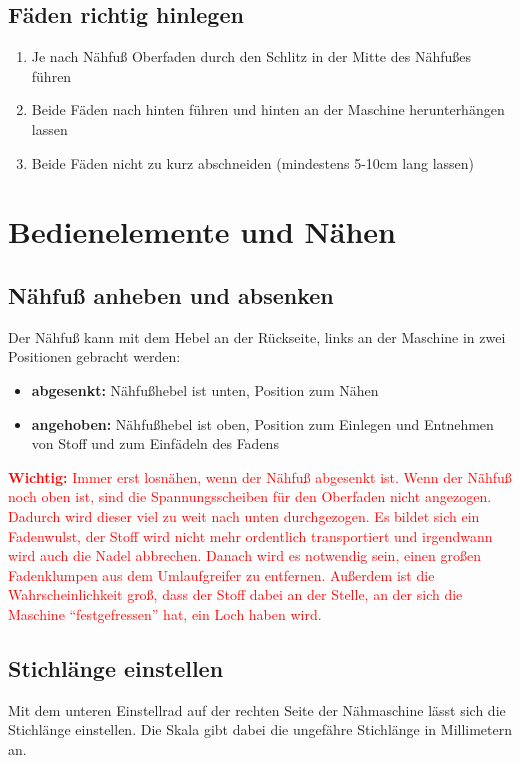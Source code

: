 \documentclass{\basedir/fablab-document}
\begin{document}
\subsection{Fäden richtig hinlegen}
\begin{enumerate}
	\item Je nach Nähfuß Oberfaden durch den Schlitz in der Mitte des Nähfußes führen
	\item Beide Fäden nach hinten führen und hinten an der Maschine herunterhängen lassen
	\item Beide Fäden nicht zu kurz abschneiden (mindestens 5-10cm lang lassen)
\end{enumerate}


\clearpage
\section{Bedienelemente und Nähen}
\subsection{Nähfuß anheben und absenken}
Der Nähfuß kann mit dem Hebel an der Rückseite, links an der Maschine in zwei Positionen gebracht werden:
\begin{itemize}
	\item \textbf{abgesenkt:} Nähfußhebel ist unten, Position zum Nähen
	\item \textbf{angehoben:} Nähfußhebel ist oben, Position zum Einlegen und Entnehmen von Stoff und zum Einfädeln des Fadens
\end{itemize}

\textcolor{red}{
	\textbf{Wichtig:} Immer erst losnähen, wenn der Nähfuß abgesenkt ist. Wenn der Nähfuß noch oben ist, sind die Spannungsscheiben für den Oberfaden nicht angezogen.
	Dadurch wird dieser viel zu weit nach unten durchgezogen. Es bildet sich ein Fadenwulst, der Stoff wird nicht mehr ordentlich transportiert und irgendwann wird auch die Nadel abbrechen. Danach wird es notwendig sein, einen großen Fadenklumpen aus dem Umlaufgreifer zu entfernen.
	Außerdem ist die Wahrscheinlichkeit groß, dass der Stoff dabei an der Stelle, an der sich die Maschine \enquote{festgefressen} hat, ein Loch haben wird.
}

\subsection{Stichlänge einstellen}
Mit dem unteren Einstellrad auf der rechten Seite der Nähmaschine lässt sich die Stichlänge einstellen. Die Skala gibt dabei die ungefähre Stichlänge in Millimetern an.
\end{document}
